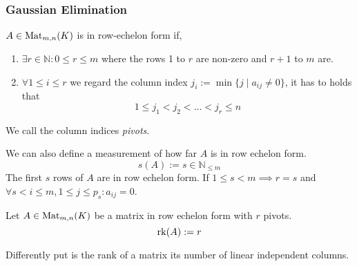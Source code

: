 \subsubsection{Gaussian Elimination}
\begin{definition}\label{def:row_echelon}
   \(A \in \operatorname{Mat}_{m,n}(K)\) is in row-echelon form if,

   \begin{enumerate}[label=\roman*, align=Center]
      \item \(\exists r \in \mathbb{N}: 0 \leq r \leq m\) where the rows 1 to \(r\) are non-zero and \(r+1\) to \(m\) are.
      \item \(\forall 1 \leq i \leq r\) we regard the column index \(j_i := \min\{j \mid a_{ij} \neq 0\}\), it has to holds that
         \[1 \leq j_1 < j_2 < \ldots < j_r \leq n\]
   \end{enumerate}
\end{definition}
\begin{remark}
   We call the column indices \textit{pivots}.
\end{remark}
\begin{remark}
   We can also define a measurement of how far \(A\) is in row echelon form.
   \[s(A) := s \in \mathbb{N}_{\leq m}\]
   The first \(s\) rows of \(A\) are in row echelon form.
   If \(1 \leq s < m \implies r = s\) and \(\forall s < i \leq m, 1 \leq j \leq p_s: a_{ij} = 0\).
\end{remark}

\begin{definition}\label{def:mat_rank}
   Let \(A \in \operatorname{Mat}_{m,n}(K)\) be a matrix in row echelon form with \(r\) pivots.
   \[\operatorname{rk}(A) := r\]
\end{definition}
\begin{remark}
   Differently put is the rank of a matrix its number of linear independent columns.
\end{remark}

